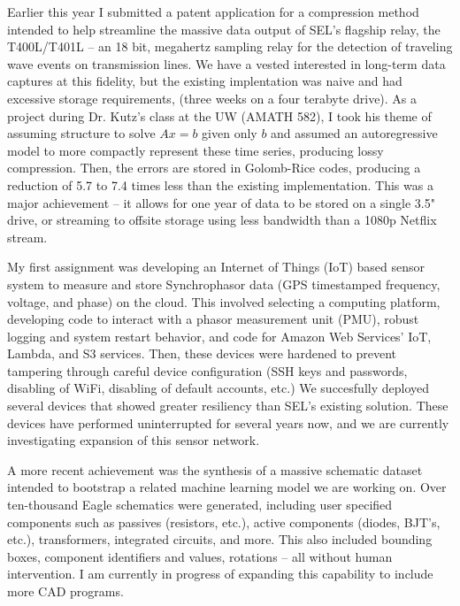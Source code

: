 \documentclass[letterpaper]{article}
\begin{document}
Earlier this year I submitted a patent application for a compression method intended
to help streamline the massive data output of SEL's flagship relay, the T400L/T401L -- an
18 bit, megahertz sampling relay for the detection of traveling wave events on
transmission lines. We have a vested interested in long-term data captures at this
fidelity, but the existing implentation was naive and had excessive storage requirements,
(three weeks on a four terabyte drive). As a project during Dr. Kutz's class at the UW
(AMATH 582), I took his theme of assuming structure to solve $Ax=b$ given only $b$ and
assumed an autoregressive model to more compactly represent these time series,
producing lossy compression. Then, the errors are stored in Golomb-Rice codes, producing
a reduction of 5.7 to 7.4 times less than the existing implementation. This was a
major achievement -- it allows for one year of data to be stored on a single 3.5"
drive, or streaming to offsite storage using less bandwidth than a 1080p Netflix stream.

My first assignment was developing an Internet
of Things (IoT) based sensor system to measure and store Synchrophasor data (GPS timestamped
frequency, voltage, and phase) on the cloud. This involved selecting a computing platform,
developing code to interact with a phasor measurement unit (PMU), robust logging and
system restart behavior, and code for Amazon Web Services' IoT, Lambda, and S3
services. Then, these devices were hardened to prevent tampering through
careful device configuration (SSH keys and passwords, disabling of WiFi, disabling
of default accounts, etc.) We succesfully deployed several devices that showed greater
resiliency than SEL's existing solution. These devices have performed uninterrupted for
several years now, and we are currently investigating expansion of this sensor network.


A more recent achievement was the synthesis of a massive schematic dataset intended to
bootstrap a related machine learning model we are working on. Over ten-thousand Eagle
schematics were generated, including user specified components such as passives
(resistors, etc.), active components (diodes, BJT's, etc.), transformers, integrated
circuits, and more. This also included bounding boxes, component identifiers and values,
rotations -- all without human intervention. I am currently in progress of expanding
this capability to include more CAD programs.
\end{document}
